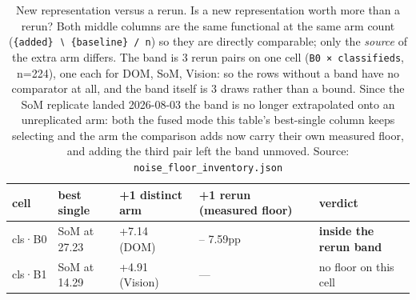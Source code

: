 \begin{table}[tp]
\centering
\caption{New representation versus a rerun. Is a new representation worth more than a rerun? Both middle columns are the same functional at the same arm count (\texttt{\textbar{}\{added\}\ ∖\ \{baseline\}\textbar{}\ /\ n}) so they are directly comparable; only the \emph{source} of the extra arm differs. The band is 3 rerun pairs on one cell (\texttt{B0\ ×\ classifieds}, n=224), one each for DOM, SoM, Vision: so the rows without a band have no comparator at all, and the band itself is 3 draws rather than a bound. Since the SoM replicate landed 2026-08-03 the band is no longer extrapolated onto an unreplicated arm: both the fused mode this table's best-single column keeps selecting and the arm the comparison adds now carry their own measured floor, and adding the third pair left the band unmoved. Source: \texttt{noise\_floor\_inventory.json}}
\label{tab:t18}
\footnotesize
\setlength{\tabcolsep}{3pt}
\begin{tabular}{@{}
  >{\raggedright\arraybackslash}p{}
  >{\raggedright\arraybackslash}p{}
  >{\raggedright\arraybackslash}p{}
  >{\raggedright\arraybackslash}p{}
  >{\raggedright\arraybackslash}p{}@{}}
\toprule
\begin{minipage}[b]{\linewidth}\raggedright
cell
\end{minipage} & \begin{minipage}[b]{\linewidth}\raggedright
best single
\end{minipage} & \begin{minipage}[b]{\linewidth}\raggedright
+1 distinct arm
\end{minipage} & \begin{minipage}[b]{\linewidth}\raggedright
+1 rerun (measured floor)
\end{minipage} & \begin{minipage}[b]{\linewidth}\raggedright
verdict
\end{minipage} \\
\midrule
cls·B0 & SoM at 27.23 & +7.14 (DOM) & 4.91 -- 7.59pp & \textbf{inside the rerun band} \\
cls·B1 & SoM at 14.29 & +4.91 (Vision) & --- & no floor on this cell \\

\end{tabular}
\end{table}
